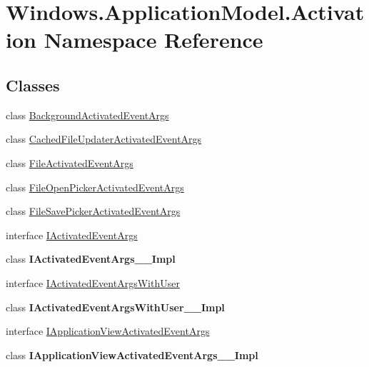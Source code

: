 \hypertarget{namespace_windows_1_1_application_model_1_1_activation}{}\section{Windows.\+Application\+Model.\+Activation Namespace Reference}
\label{namespace_windows_1_1_application_model_1_1_activation}
\subsection*{Classes}
\begin{DoxyCompactItemize}
\item 
class \hyperlink{class_windows_1_1_application_model_1_1_activation_1_1_background_activated_event_args}{Background\+Activated\+Event\+Args}
\item 
class \hyperlink{class_windows_1_1_application_model_1_1_activation_1_1_cached_file_updater_activated_event_args}{Cached\+File\+Updater\+Activated\+Event\+Args}
\item 
class \hyperlink{class_windows_1_1_application_model_1_1_activation_1_1_file_activated_event_args}{File\+Activated\+Event\+Args}
\item 
class \hyperlink{class_windows_1_1_application_model_1_1_activation_1_1_file_open_picker_activated_event_args}{File\+Open\+Picker\+Activated\+Event\+Args}
\item 
class \hyperlink{class_windows_1_1_application_model_1_1_activation_1_1_file_save_picker_activated_event_args}{File\+Save\+Picker\+Activated\+Event\+Args}
\item 
interface \hyperlink{interface_windows_1_1_application_model_1_1_activation_1_1_i_activated_event_args}{I\+Activated\+Event\+Args}
\item 
class {\bfseries I\+Activated\+Event\+Args\+\_\+\+\_\+\+Impl}
\item 
interface \hyperlink{interface_windows_1_1_application_model_1_1_activation_1_1_i_activated_event_args_with_user}{I\+Activated\+Event\+Args\+With\+User}
\item 
class {\bfseries I\+Activated\+Event\+Args\+With\+User\+\_\+\+\_\+\+Impl}
\item 
interface \hyperlink{interface_windows_1_1_application_model_1_1_activation_1_1_i_application_view_activated_event_args}{I\+Application\+View\+Activated\+Event\+Args}
\item 
class {\bfseries I\+Application\+View\+Activated\+Event\+Args\+\_\+\+\_\+\+Impl}

\end{DoxyCompactItemize}
